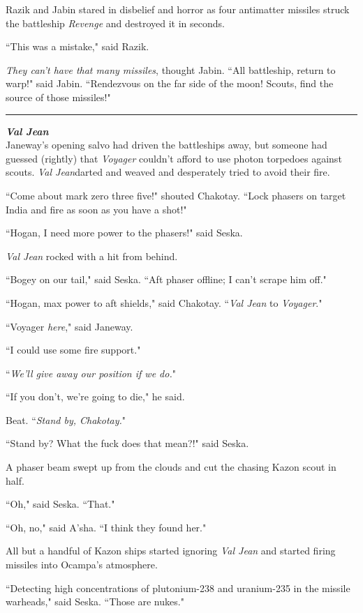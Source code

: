 \documentclass[twoside,letterpaper,12pt]{memoir}
\begin{document}
Razik and Jabin stared in disbelief and horror as four antimatter missiles struck the battleship \textit{Revenge} and destroyed it in seconds.

``This was a mistake," said Razik.

\textit{They can't have that many missiles}, thought Jabin. ``All battleship, return to warp!" said Jabin. ``Rendezvous on the far side of the moon! Scouts, find the source of those missiles!"

\fancybreak{\rule{3cm}{0.4 pt}}
\noindent\textit{\textbf{Val Jean}}\\

Janeway's opening salvo had driven the battleships away, but someone had guessed (rightly) that \textit{Voyager} couldn't afford to use photon torpedoes against scouts. \textit{Val Jean}darted and weaved and desperately tried to avoid their fire.

``Come about mark zero three five!" shouted Chakotay. ``Lock phasers on target India and fire as soon as you have a shot!"

``Hogan, I need more power to the phasers!" said Seska.

\textit{Val Jean} rocked with a hit from behind.

``Bogey on our tail," said Seska. ``Aft phaser offline; I can't scrape him off."

``Hogan, max power to aft shields," said Chakotay. ``\textit{Val Jean} to \textit{Voyager}."

``Voyager \textit{here}," said Janeway.

``I could use some fire support."

``\textit{We'll give away our position if we do.}"

``If you don't, we're going to die," he said.

Beat. ``\textit{Stand by, Chakotay.}"

``Stand by? What the fuck does that mean?!" said Seska.

A phaser beam swept up from the clouds and cut the chasing Kazon scout in half.

``Oh," said Seska. ``That."

``Oh, no," said A'sha. ``I think they found her."

All but a handful of Kazon ships started ignoring \textit{Val Jean} and started firing missiles into Ocampa's atmosphere.

``Detecting high concentrations of plutonium-238 and uranium-235 in the missile warheads," said Seska. ``Those are nukes."
\end{document}
